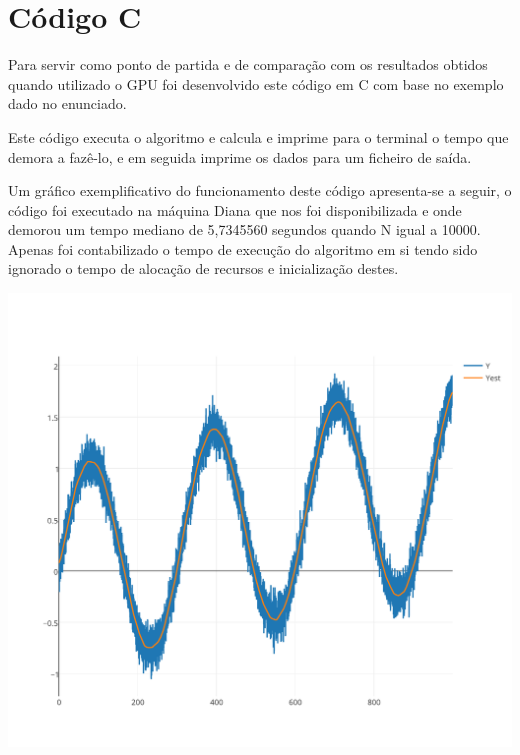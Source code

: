 \chapter{Código C}
Para servir como ponto de partida e de comparação com os resultados obtidos quando utilizado o GPU foi desenvolvido este código em C com base no exemplo dado no enunciado.



Este código executa o algoritmo e calcula e imprime para o terminal o tempo que demora a fazê-lo, e em seguida imprime os dados para um ficheiro de saída.

Um gráfico exemplificativo do funcionamento deste código apresenta-se a seguir, o código foi executado na máquina Diana que nos foi disponibilizada e onde demorou um tempo mediano de 5,7345560 segundos quando N igual a 10000. Apenas foi contabilizado o tempo de execução do algoritmo em si tendo sido ignorado o tempo de alocação de recursos e inicialização destes. 

\includegraphics[width=\textwidth]{output}